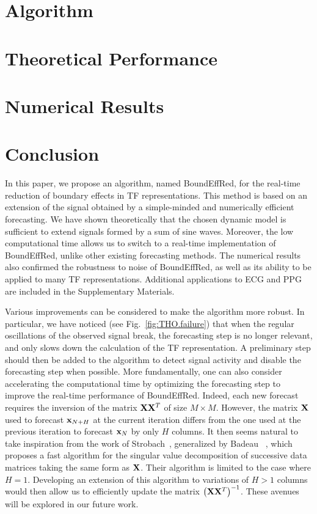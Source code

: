 \documentclass[journal]{IEEEtran}
\begin{document}
\section{Algorithm}
\label{se:algo}



\section{Theoretical Performance}
\label{se:theoretical}


\section{Numerical Results}
\label{se:results}


\section{Conclusion}
\label{se:conclusion}
In this paper, we propose an algorithm, named {\sf BoundEffRed}, for the real-time reduction of boundary effects in TF representations. This method is based on an extension of the signal obtained by a simple-minded and numerically efficient forecasting. We have shown theoretically that the chosen dynamic model is sufficient to extend signals formed by a sum of sine waves. Moreover, the low computational time allows us to switch to a real-time implementation of {\sf BoundEffRed}, unlike other existing forecasting methods. The numerical results also confirmed the robustness to noise of {\sf BoundEffRed}, as well as its ability to be applied to many TF representations. Additional applications to ECG and PPG are included in the Supplementary Materials.

Various improvements can be considered to make the algorithm more robust. In particular, we have noticed (see Fig.~\ref{fig:THO.failure}) that when the regular oscillations of the observed signal break, the forecasting step is no longer relevant, and only slows down the calculation of the TF representation. A preliminary step should then be added to the algorithm to detect signal activity and disable the forecasting step when possible. More fundamentally, one can also consider accelerating the computational time by optimizing the forecasting step to improve the real-time performance of {\sf BoundEffRed}. Indeed, each new forecast requires the inversion of the matrix ${\mathbf X}{\mathbf X}^T$ of size $M\times M$. However, the matrix ${\mathbf X}$ used to forecast ${\mathbf x}_{N+H}$ at the current iteration differs from the one used at the previous iteration to forecast ${\mathbf x}_{N}$ by only $H$ columns. It then seems natural to take inspiration from the work of Strobach~\cite{Strobach97square}, generalized by Badeau \etal~\cite{Badeau04sliding}, which proposes a fast algorithm for the singular value decomposition of successive data matrices taking the same form as ${\mathbf X}$. Their algorithm is limited to the case where $H=1$. Developing an extension of this algorithm to variations of $H>1$ columns would then allow us to efficiently update the matrix $\left({\mathbf X}{\mathbf X}^T\right)^{-1}$. These avenues will be explored in our future work.
\end{document}
